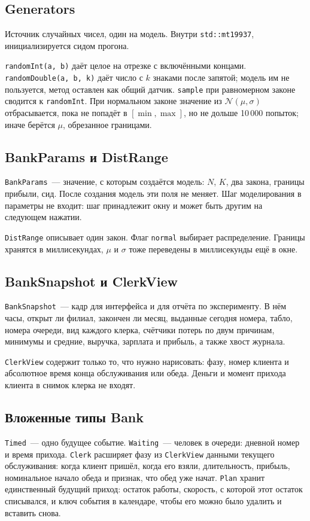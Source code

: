 \documentclass[a4paper,12pt]{article}
\begin{document}
\subsection*{Generators}
Источник случайных чисел, один на модель. Внутри \texttt{std::mt19937}, инициализируется сидом прогона.

\texttt{randomInt(a, b)} даёт целое на отрезке с включёнными концами. \texttt{randomDouble(a, b, k)} даёт число с \(k\) знаками после запятой; модель им не пользуется, метод оставлен как общий датчик. \texttt{sample} при равномерном законе сводится к \texttt{randomInt}. При нормальном законе значение из \(\mathcal N(\mu,\sigma)\) отбрасывается, пока не попадёт в \([\min,\max]\), но не дольше 10\,000 попыток; иначе берётся \(\mu\), обрезанное границами.

\subsection*{BankParams и DistRange}
\texttt{BankParams}~--- значение, с которым создаётся модель: \(N\), \(K\), два закона, границы прибыли, сид. После создания модель эти поля не меняет. Шаг моделирования в параметры не входит: шаг принадлежит окну и может быть другим на следующем нажатии.

\texttt{DistRange} описывает один закон. Флаг \texttt{normal} выбирает распределение. Границы хранятся в миллисекундах, \(\mu\) и \(\sigma\) тоже переведены в миллисекунды ещё в окне.

\subsection*{BankSnapshot и ClerkView}
\texttt{BankSnapshot}~--- кадр для интерфейса и для отчёта по эксперименту. В нём часы, открыт ли филиал, закончен ли месяц, выданные сегодня номера, табло, номера очереди, вид каждого клерка, счётчики потерь по двум причинам, минимумы и средние, выручка, зарплата и прибыль, а также хвост журнала.

\texttt{ClerkView} содержит только то, что нужно нарисовать: фазу, номер клиента и абсолютное время конца обслуживания или обеда. Деньги и момент прихода клиента в снимок клерка не входят.

\subsection*{Вложенные типы Bank}
\texttt{Timed}~--- одно будущее событие. \texttt{Waiting}~--- человек в очереди: дневной номер и время прихода. \texttt{Clerk} расширяет фазу из \texttt{ClerkView} данными текущего обслуживания: когда клиент пришёл, когда его взяли, длительность, прибыль, номинальное начало обеда и признак, что обед уже начат. \texttt{Plan} хранит единственный будущий приход: остаток работы, скорость, с которой этот остаток списывался, и ключ события в календаре, чтобы его можно было удалить и вставить снова.
\end{document}
